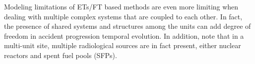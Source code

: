 Modeling limitations of ETs/FT based methods are even more limiting when dealing with 
multiple complex systems that are coupled to each other. In fact, the presence of shared 
systems and structures among the units can add degree of freedom in accident progression 
temporal evolution.
In addition, note that in a multi-unit site, multiple radiological sources are in fact present, 
either nuclear reactors and spent fuel pools (SFPs). 
 



